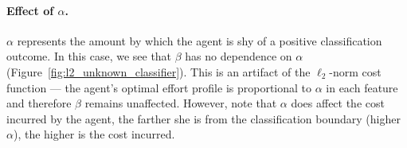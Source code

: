 \paragraph{Effect of $\alpha$.} $\alpha$ represents the amount by which the agent is shy of a positive classification outcome. In this case, we see that $\beta$ has no dependence on $\alpha$ (Figure~\ref{fig:l2_unknown_classifier}). This is an artifact of the $\ell_2$-norm cost function --- the agent's optimal effort profile is proportional to $\alpha$ in each feature and therefore $\beta$ remains unaffected. However, note that $\alpha$ does affect the cost incurred by the agent, the farther she is from the classification boundary (higher $\alpha$), the higher is the cost incurred.  





